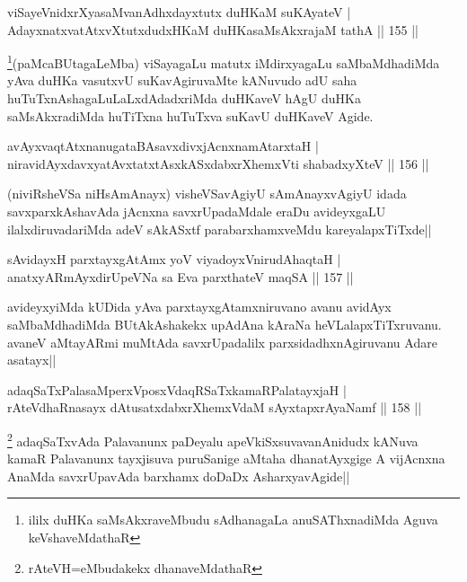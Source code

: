 \begin{shl}
viSayeVnidxrXyasaMvanAdhxdayxtutx duHKaM suKAyateV |\\
AdayxnatxvatAtxvXtutxdudxHKaM duHKasaMsAkxrajaM tathA \hfill || 155 ||
\end{shl}

\begin{artha}
\footnote[1]{ililx duHKa saMsAkxraveMbudu sAdhanagaLa anuSAThxnadiMda Aguva keVshaveMdathaR}(paMcaBUtagaLeMba) viSayagaLu matutx iMdirxyagaLu saMbaMdhadiMda yAva duHKa vasutxvU suKavAgiruvaMte kANuvudo adU saha huTuTxnAshagaLuLaLxdAdadxriMda duHKaveV hAgU duHKa saMsAkxradiMda huTiTxna huTuTxva suKavU duHKaveV Agide.
\end{artha}

\begin{shl}
avAyxvaqtAtxnanugataBAsavxdivxjAcnxnamAtarxtaH |\\
niravidAyxdavxyatAvxtatxtAsxkASxdabxrXhemxVti shabadxyXteV \hfill || 156 ||
\end{shl}

\begin{artha}%
(niviRsheVSa niHsAmAnayx) visheVSavAgiyU sAmAnayxvAgiyU idada savxparxkAshavAda jAcnxna savxrUpadaMdale eraDu avideyxgaLU ilalxdiruvadariMda adeV sAkASxtf parabarxhamxveMdu kareyalapxTiTxde||
\end{artha}

\begin{shl}
sAvidayxH parxtayxgAtAmx yoV viyadoyxVnirudAhaqtaH |\\
anatxyARmAyxdirUpeVNa sa Eva parxthateV maqSA \hfill || 157 ||
\end{shl}

\begin{artha}
avideyxyiMda kUDida yAva parxtayxgAtamxniruvano avanu avidAyx saMbaMdhadiMda BUtAkAshakekx upAdAna kAraNa heVLalapxTiTxruvanu. avaneV aMtayARmi muMtAda savxrUpadalilx parxsidadhxnAgiruvanu Adare asatayx||
\end{artha}

\begin{shl}
adaqSaTxPalasaMperxVposxVdaqRSaTxkamaRPalatayxjaH |\\
rAteVdhaRnasayx dAtusatxdabxrXhemxVdaM sAyxtapxrAyaNamf \hfill || 158 ||
\end{shl}

\begin{artha}
\footnote[1]{rAteVH=eMbudakekx dhanaveMdathaR} adaqSaTxvAda Palavanunx paDeyalu apeVkiSxsuvavanAnidudx kANuva kamaR Palavanunx tayxjisuva puruSanige aMtaha dhanatAyxgige A vijAcnxna AnaMda savxrUpavAda barxhamx doDaDx AsharxyavAgide||
\end{artha}

